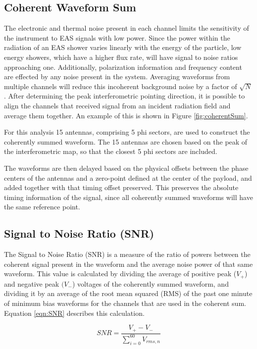 		
	\subsection{Coherent Waveform Sum}
		The electronic and thermal noise present in each channel limits the sensitivity of the instrument to EAS signals with low power.  Since the power within the radiation of an EAS shower varies linearly with the energy of the particle, low energy showers, which have a higher flux rate, will have signal to noise ratios approaching one.  Additionally, polarization information and frequency content are effected by any noise present in the system.  Averaging waveforms from multiple channels will reduce this incoherent background noise by a factor of $\sqrt{N}$.  After determining the peak interferometric pointing direction, it is possible to align the channels that received signal from an incident radiation field and average them together.  An example of this is shown in Figure \ref{fig:coherentSum}.
		
		For this analysis 15 antennas, comprising 5 phi sectors, are used to construct the coherently summed waveform.  The 15 antennas are chosen based on the peak of the interferometric map, so that the closest 5 phi sectors are included.  
		
		The waveforms are then delayed based on the physical offsets between the phase centers of the antennas and a zero-point defined at the center of the payload, and added together with that timing offset preserved.  This preserves the absolute timing information of the signal, since all coherently summed waveforms will have the same reference point.
		
		
	\subsection{Signal to Noise Ratio (SNR)}
		The Signal to Noise Ratio (SNR) is a measure of the ratio of powers between the coherent signal present in the waveform  and the average noise power of that same waveform.  This value is calculated by dividing the average of positive peak ($V_+$) and negative peak $(V_-$) voltages of the coherently summed waveform, and dividing it by an average of the root mean squared (RMS) of the  past one minute of minimum bias waveforms for the channels that are used in the coherent sum.  Equation \ref{eqn:SNR} describes this calculation.
		
	\begin{equation}
	SNR = \frac{V_{+}-V_{-}}{\sum^{60}_{i=0} V_{rms,n}}
	\label{eqn:SNR}
	\end{equation}
	
